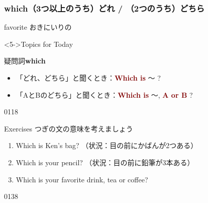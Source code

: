 \documentclass[aspectratio=169,xcolor={dvipsnames,table}]{beamer}
\begin{document}
\begin{frame}[plain]\frametitle{which\hspace{20pt}（3つ以上のうち）どれ / （2つのうち）どちら}
\Large
 
\begin{enumerate}
 \hfill{}
\hfill{}
\end{enumerate}

\hfill{\scriptsize favorite  おきにいりの}

\vspace{20pt}

\begin{block}<5->{Topics for Today}
\small

疑問詞{\bfseries which} 
\begin{itemize}[square]\small
  \item 「どれ、どちら」と聞くとき：\textcolor{Maroon}{\bfseries Which is}   〜 ?
 \item 「AとBのどちら」と聞くとき：\textcolor{Maroon}{\bfseries Which is} 〜, \textcolor{Maroon}{\bfseries A or B} ?
\end{itemize}
     \end{block}

\mbox{}\hfill{\tiny 0118}\,{\scriptsize {}}

\end{frame}
\begin{frame}[plain]{Exercises}
つぎの文の意味を考えましょう

\begin{enumerate}
 \item Which is Ken's bag? {\scriptsize （状況：目の前にかばんが2つある）}
 \item Which is your pencil? {\scriptsize （状況：目の前に鉛筆が3本ある）}
 \item Which is your favorite drink, tea or coffee?
\end{enumerate} 

\mbox{}\hfill{\tiny 0138}\,{\scriptsize {}}
\end{frame}
\end{document}
